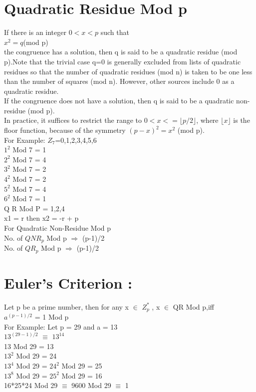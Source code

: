 \documentclass{article}
\begin{document}
\section{Quadratic Residue Mod p}
If there is an integer $0<x<p$ such that\\
$x^{2}=q$(mod p)\\
the congruence has a solution, then q is said to be a quadratic residue (mod p).Note that the trivial case q=0 is generally excluded from lists of quadratic residues so that the number of quadratic residues (mod n) is taken to be one less than the number of squares (mod n). However, other sources include 0 as a quadratic residue. \\
If the congruence does not have a solution, then q is said to be a quadratic non-residue (mod p).\\
In practice, it suffices to restrict the range to $0<x<=\lfloor p/2 \rfloor$, where $\lfloor x \rfloor$ is the floor function, because of the symmetry $(p-x)^2=x^2$ (mod p). 
\\ For Example: $Z_7$={0,1,2,3,4,5,6}
\\ $1^{2}$ Mod 7 = 1
\\ $2^{2}$ Mod 7 = 4
\\ $3^{2}$ Mod 7 = 2
\\ $4^{2}$ Mod 7 = 2
\\ $5^{2}$ Mod 7 = 4
\\ $6^{2}$ Mod 7 = 1
\\ Q R Mod P = {1,2,4} \\
x1 = r then x2 = -r + p \\
For Quadratic Non-Residue Mod p \\
No. of $QNR_p$ Mod p $\Rightarrow$ (p-1)/2 \\
No. of $QR_p$ Mod p $\Rightarrow$ (p-1)/2 
\section{Euler's Criterion :}
Let p be a prime number, then for any x $\in$ $Z_p^{*}$ , x $\in$ QR Mod p,iff
\\ $a^{(p-1)/2}$ = 1 Mod p
\\For Example: Let p = 29 and a = 13
\\ $13^{(29-1)/2}$ $\equiv$ $13^{14}$ \\
13 Mod 29 = 13  \\
$13^{2}$ Mod 29 = 24  \\
$13^{4}$ Mod 29 = $24^{2}$ Mod 29 = 25  \\
$13^{8}$ Mod 29 = $25^{2}$ Mod 29 = 16  \\
16*25*24 Mod 29 $\equiv$ 9600 Mod 29 $\equiv$ 1
\end{document}
